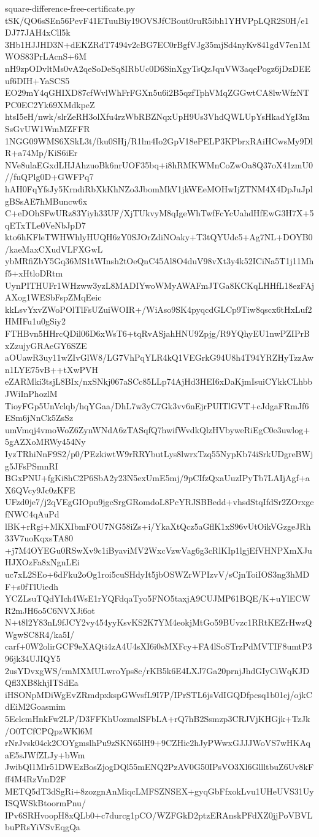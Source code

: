 \documentclass[11pt]{article}
\theoremstyle{definition}
\theoremstyle{remark}
\begin{document}
\begin{filecontents*}[overwrite]{square-difference-free-certificate.py}
tSK/QO6sSEn56PevF41ETuuBiy19OVSJfCBout0ruR5ibh1YHVPpLQR2S0H/e1DJ77JAH4xCll5k
3Hb1HJJHD3N+dEKZRdT7494v2cBG7EC0rBgfVJg35mjSd4nyKv841gdV7en1MWOS83PrLAcnS+6M
nH9zpODvltMs0vA2qeSoDeSq8IRbUc0D6SinXgyTsQzJquVW3aqePogz6jDzDEEuf6DIH+YaSCS5
EO29mY4qGHIXD87cfWvlWhFrFGXn5u6i2B5qzfTphVMqZGGwtCA8lwWfzNTPC0EC2Yk69XMdkpeZ
htsI5eH/nwk/slrZeRH3olXfu4rzWbRBZNqxUpH9Us3VhdQWLUpYsHkadYgI3mSsGvUW1WmMZFFR
1NGG09WMS6XSkL3t/fku0SHj/R1lm4Io2GpV18ePELP3KPbrxRAiHCwsMy9DlR+a74Mp/KiS6iEr
NVe8ulaEGxdLHJAhzuoBk6nrUOF35bq+i8hRMKWMnCoZwOa8Q37oX41zmU0//fuQPlg0D+GWFPq7
hAH0FqYfsJy5KrndiRbXkKhNZo3JbomMkV1jkWEeMOHwIjZTNM4X4DpJuJplgBSsAE7hMBuncw6x
C+eDOhSFwURz83Yiyh33UF/XjTUkvyM8qIgeWhTwfFcYcUahdHfEwG3H7X+5qETxTLe0VeNbJpD7
kto6hKFleTWHWhlyHUQH6zY0SJOrZdiNOaky+T3tQYUdc5+Ag7NL+DOYB0/kaeMaxCXudVLFXGwL
ybMRfiZbY5Gq36MS1tWInsh2tOeQnC45Al8O4duV98vXt3y4k52ICiNa5T1j11Mhf5+xHtloDRtm
UynPITHUFr1WHzww3yzL8MADIYwoWMyAWAFmJTGa8KCKqLHHfL18ezFAjAXog1WESbFspZMqEeic
kkLsvYxvZWoPOlTlFsUZuiWOIR+/WiAso9SK4pyqcdGLCp9Tiw8qscx6tHxLuf2HMIFu1u0gSiy2
FTHBvn5HHrcQDil06D6xWsT6+tqRvASjahHNU9Zpjg/R9YQhyEU1nwPZIPrBxZzujyGRAeGY6SZE
aOUawR3uy11wZIvGlW8/LG7VhPqYLR4kQ1VEGrkG94U8h4T94YRZHyTzzAwn1LYE75vB++tXwPVH
eZARMki3tsjL8BIx/nxSNkj067aSCc85LLp74AjHd3HEI6xDaKjmIsuiCYkkCLhbbJWiInPhozlM
TioyFGp5UnVclqb/hqYGaa/DhL7w3yC7Gk3vv6nEjrPUITlGVT+cJdgaFRmJf6ESm6jNnCk5ZsSz
umVmqj4vmoWoZ6ZynWNdA6zTASqfQ7hwifWvdkQlzHVbyweRiEgC0e3uwlog+5gAZXoMRWy454Ny
IyzTRhiNnF9S2/p0/PEzkiwtW9rRRYbutLys8lwrxTzq55NypKb74iSrkUDgreBWjg5JFsPSmnRI
BGxPNU+fgKi8hC2P6SbA2y23N5exUmE5mj/9pCIfzQxaUuzIPyTb7LAIjAgf+aX6QVcy9Jc0zKFE
UFzd0je7/j2qVEgGIOpu9jgcSrgGRomdoL8PcYRJSBBedd+vhsdStqIfdSr2ZOrxgcfNWC4qAuPd
lBK+rRgi+MKXIbmFOU7NG58iZs+i/YkaXtQcz5aGflK1xS96vUtOikVGzgeJRh33V7uoKqxsTA80
+j7M4OYEGu0RSwXv9c1iByaviMV2WxcVzwVag6g3cRlKIp1lgjEfVHNPXmXJuHJXOzFa8xNgnLEi
uc7xL2SEo+6dFku2oOg1roi5cuSHdyIt5jbOSWZrWPIzvV/sCjnToiIOS3ng3hMDF+s0fTlUiedh
YCZLsuTQdYIch4WsE1rYQFdqaTyo5FNO5taxjA9CUJMP61BQE/K+uYlECWR2mJH6o5C6NVXJi6ot
N+t8l2Y83nL9fJCY2vy454yyKsvKS2K7YM4eokjMtGo59BUvzc1RRtKEZrHwzQWgwSC8R4/ka5I/
carf+0W2olirGCF9eXAQti4zA4U4sXI6i0sMXFcy+FA4lSoSTrzPdMVTIF8umtP396jk34UJIQY5
2usYDvxgWS/rmMXMULwroYps8c/rKB5k6E4LXJ7Ga20prnjJhdGIyCiWqKJDQfl3XB8khjITSdEa
iHSONpMDiWgEvZRmdpxkspGWvsfL9I7P/IPrSTL6jsVdIGQDfpcsq1b01cj/ojkCdEiM2Goasmim
5EclcmHnkFw2LP/D3FFKhUozmalSFbLA+rQ7hB2Ssmzp3CRJVjKHGjk+TzJk/O0TCfCPQpzWKl6M
rNrJvsk04ck2COYgmslhPu9zSKN65lH9+9CZHic2hJyPWwxGJJJWoVS7wHKAqaE5sJWfZLJy+bWm
JwibQl1Mlr51DWEzBosZjogDQl55mENQ2PzAV0G50IPsVO3Xl6GllltbuZ6Uv8kFff4M4RzVmD2F
METQ5dT3dSgRi+8zozgnAnMiqcLMFSZNSEX+gyqGbFfxokLvu1UHeUVS31UyISQWSkBtoormPnu/
IPv6SRHvoopH8xQLb0+c7durcg1pCO/WZFGkD2ptzERAnskPFdXZ0jjPoVBVLbuPRsYiVSvEqgQa

\end{filecontents*}
\end{document}
